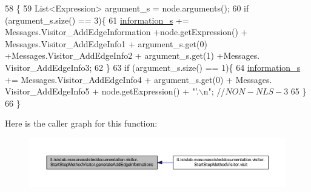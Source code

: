 \begin{DoxyCode}
58                                                                     \{
59         List<Expression> argument\_s = node.arguments();
60         \textcolor{keywordflow}{if} (argument\_s.size() == 3)\{
61             \hyperlink{classit_1_1isislab_1_1masonassisteddocumentation_1_1visitor_1_1_code_visitor_a628ab846d2f4de647f171060ebe73774}{information\_s} += Messages.Visitor\_AddEdgeInformation +node.getExpression() +
      Messages.Visitor\_AddEdgeInfo1 + argument\_s.get(0) +Messages.Visitor\_AddEdgeInfo2 + argument\_s.get(1) +Messages.
      Visitor\_AddEdgeInfo3;
62         \}
63         \textcolor{keywordflow}{if} (argument\_s.size() == 1)\{
64             \hyperlink{classit_1_1isislab_1_1masonassisteddocumentation_1_1visitor_1_1_code_visitor_a628ab846d2f4de647f171060ebe73774}{information\_s} += Messages.Visitor\_AddEdgeInfo4 + argument\_s.get(0) + Messages.
      Visitor\_AddEdgeInfo5 + node.getExpression() + \textcolor{stringliteral}{"'.\(\backslash\)n"}; \textcolor{comment}{//$NON-NLS-3$}
65         \}
66     \}
\end{DoxyCode}


Here is the caller graph for this function\-:
\nopagebreak
\begin{figure}[H]
\begin{center}
\leavevmode
\includegraphics[width=350pt]{classit_1_1isislab_1_1masonassisteddocumentation_1_1visitor_1_1_start_step_method_visitor_a11cd1a31034690b4967546ff9250ead6_icgraph}
\end{center}
\end{figure}


